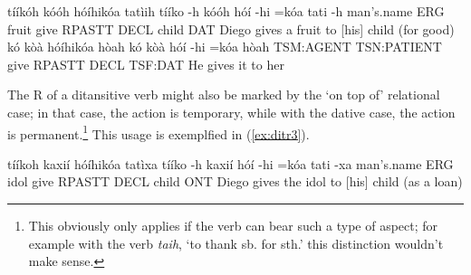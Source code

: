 \documentclass[a4paper, 12pt, oneside]{memoir}
\newcommand{\emh}[1]{\textit{#1}}
\begin{document}
\begin{examples}
    \ex \label{ex:ditr1}
    \words tííkóh kóóh hóíhikóa tatìih
    \bits tííko -h kóóh hóí -hi =kóa tati -h
    \gloss man's.name ERG fruit give RPASTT DECL child DAT
    \tr Diego gives a fruit to [his] child (for good)
    \ex \label{ex:ditr2}
    \words kó kòà hóíhikóa hòah
    \bits kó kòà hóí -hi =kóa hòah
    \gloss TSM:AGENT TSN:PATIENT give RPASTT DECL TSF:DAT
    \tr He gives it to her
\end{examples}
The R of a ditansitive verb might also be marked by the `on top of' relational case; in that case, the action is temporary, while with the dative case, the action is permanent.\footnote{This obviously only applies if the verb can bear such a type of aspect; for example  with the verb \emh{taih}, `to thank sb. for sth.' this distinction wouldn't make sense.} This  usage is exemplfied in (\ref{ex:ditr3}). 
\begin{examples}
    \ex \label{ex:ditr3}
    \words tííkoh kaxií hóíhikóa tatìxa
    \bits tííko -h kaxií hóí -hi =kóa tati -xa
    \gloss man's.name ERG idol give RPASTT DECL child ONT
    \tr Diego gives the idol to [his] child (as a loan)
\end{examples}
\end{document}
